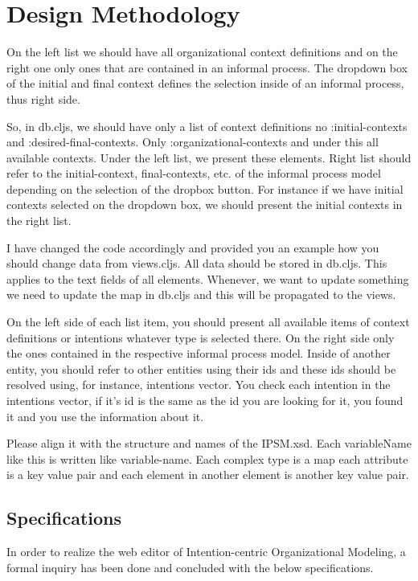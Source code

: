 \section{Design Methodology}
\label{sec:designmethodology}

On the left list we should have all organizational context definitions and on the right one only ones that are contained in an informal process. The dropdown box of the initial and final context defines the selection inside of an informal process, thus right side.

So, in db.cljs, we should have only a list of context definitions no :initial-contexts and :desired-final-contexts. Only :organizational-contexts and under this all available contexts. Under the left list, we present these elements. Right list should refer to the initial-context, final-contexts, etc. of the informal process model depending on the selection of the dropbox button. For instance if we have initial contexts selected on the dropdown box, we should present the initial contexts in the right list.

I have changed the code accordingly and provided you an example how you should change data from views.cljs. All data should be stored in db.cljs. This applies to the text fields of all elements. Whenever, we want to update something we need to update the map in db.cljs and this will be propagated to the views.


On the left side of each list item, you should present all available items of context definitions or intentions whatever type is selected there. On the right side only the ones contained in the respective informal process model. Inside of another entity, you should refer to other entities using their ids and these ids should be resolved using, for instance, intentions vector. You check each intention in the intentions vector, if it’s id is the same as the id you are looking for it, you found it and you use the information about it.  


Please align it with the structure and names of the IPSM.xsd. Each variableName like this is written like variable-name. Each complex type is a map each attribute is a key value pair and each element in another element is another key value pair.


\subsection{Specifications}
\label{subsec:specifications}
In order to realize the web editor of Intention-centric Organizational Modeling, a formal inquiry has been done and concluded with the below specifications.

